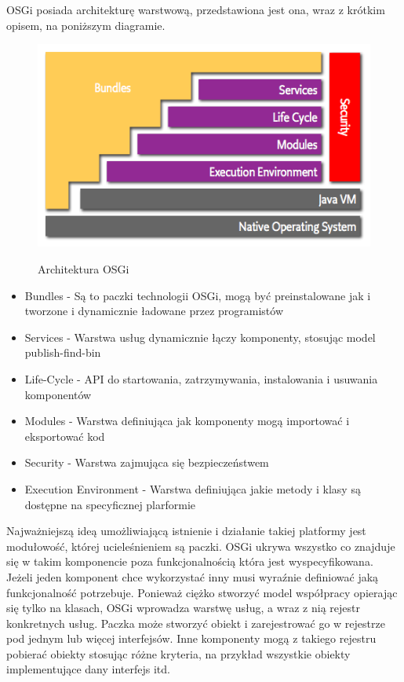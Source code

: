 OSGi posiada architekturę warstwową, przedstawiona jest ona, wraz z krótkim opisem, na poniższym diagramie.
\begin{figure}[!h]
	\centering
	\includegraphics[scale=0.65]{osgiArchitektura.png} 
	\cite{fusehomepage2012}
	\caption{Architektura OSGi}
\end{figure}
\begin{itemize}
	\item Bundles - Są to paczki technologii OSGi, mogą być preinstalowane jak i tworzone i dynamicznie ładowane przez programistów
	\item Services - Warstwa usług dynamicznie łączy komponenty, stosując model publish-find-bin
	\item Life-Cycle - API do startowania, zatrzymywania, instalowania i usuwania komponentów
	\item Modules - Warstwa definiująca jak komponenty mogą importować i eksportować kod	
	\item Security - Warstwa zajmująca się bezpieczeństwem
	\item Execution Environment - Warstwa definiująca jakie metody i klasy są dostępne na specyficznej plarformie
\end{itemize}  
Najważniejszą ideą umożliwiającą istnienie i działanie takiej platformy jest modułowość, której ucieleśnieniem są paczki. OSGi ukrywa wszystko co znajduje się w takim komponencie poza funkcjonalnością która jest wyspecyfikowana. Jeżeli jeden komponent chce wykorzystać inny musi wyraźnie definiować jaką funkcjonalność potrzebuje. Ponieważ ciężko stworzyć model współpracy opierając się tylko na klasach, OSGi wprowadza warstwę usług, a wraz z nią rejestr konkretnych usług. Paczka może stworzyć obiekt i zarejestrować go w rejestrze pod jednym lub więcej interfejsów. Inne komponenty mogą z takiego rejestru pobierać obiekty stosując różne kryteria, na przykład wszystkie obiekty implementujące dany interfejs itd.
